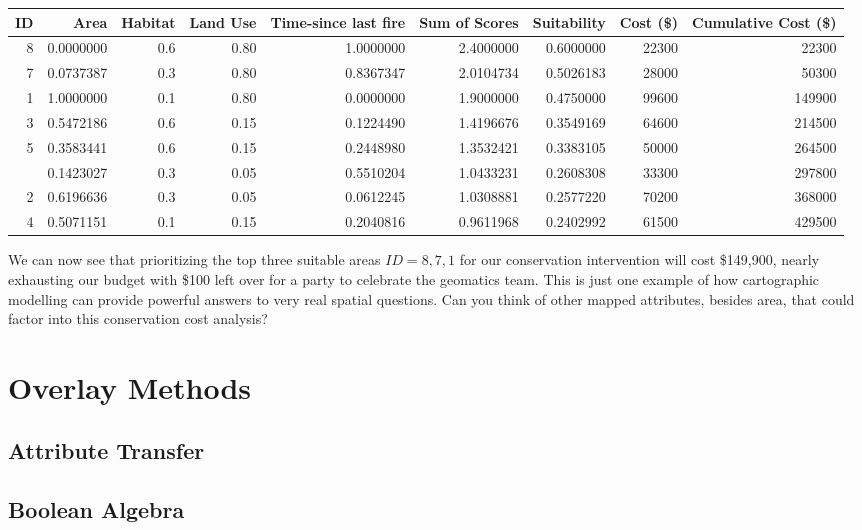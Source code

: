 \documentclass[
]{book}
\begin{document}
\begin{tabular}{rrrrrrrrr}
\toprule
ID & Area & Habitat & Land Use & Time-since last fire & Sum of Scores & Suitability & Cost (\$) & Cumulative Cost (\$)\\
\midrule
8 & 0.0000000 & 0.6 & 0.80 & 1.0000000 & 2.4000000 & 0.6000000 & 22300 & 22300\\
7 & 0.0737387 & 0.3 & 0.80 & 0.8367347 & 2.0104734 & 0.5026183 & 28000 & 50300\\
1 & 1.0000000 & 0.1 & 0.80 & 0.0000000 & 1.9000000 & 0.4750000 & 99600 & 149900\\
3 & 0.5472186 & 0.6 & 0.15 & 0.1224490 & 1.4196676 & 0.3549169 & 64600 & 214500\\
5 & 0.3583441 & 0.6 & 0.15 & 0.2448980 & 1.3532421 & 0.3383105 & 50000 & 264500\\
\addlinespace
6 & 0.1423027 & 0.3 & 0.05 & 0.5510204 & 1.0433231 & 0.2608308 & 33300 & 297800\\
2 & 0.6196636 & 0.3 & 0.05 & 0.0612245 & 1.0308881 & 0.2577220 & 70200 & 368000\\
4 & 0.5071151 & 0.1 & 0.15 & 0.2040816 & 0.9611968 & 0.2402992 & 61500 & 429500\\
\bottomrule
\end{tabular}

We can now see that prioritizing the top three suitable areas \(ID = {8,7,1}\) for our conservation intervention will cost \$149,900, nearly exhausting our budget with \$100 left over for a party to celebrate the geomatics team. This is just one example of how cartographic modelling can provide powerful answers to very real spatial questions. Can you think of other mapped attributes, besides area, that could factor into this conservation cost analysis?

\hypertarget{overlay-methods}{%
\section{Overlay Methods}\label{overlay-methods}}

\hypertarget{attribute-transfer}{%
\subsection{Attribute Transfer}\label{attribute-transfer}}

\hypertarget{boolean-algebra-1}{%
\subsection{Boolean Algebra}\label{boolean-algebra-1}}
\end{document}
